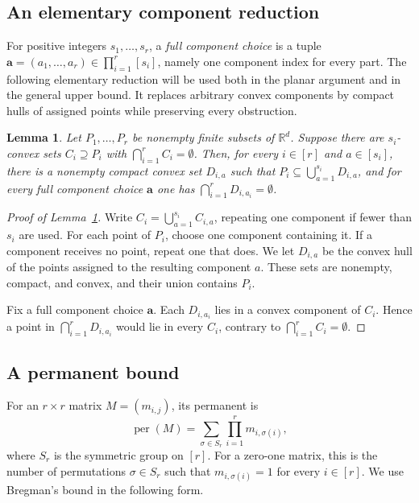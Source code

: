 \documentclass[11pt]{article}
\newtheorem{lemma}[theorem]{Lemma}
\theoremstyle{definition}
\newcommand{\R}{\mathbb{R}}
\begin{document}
\subsection{An elementary component reduction}

For positive integers \(s_{1},\ldots,s_{r}\), a \emph{full component choice} is a tuple \(\boldsymbol{a}=(a_{1},\ldots,a_{r})\in\prod_{i=1}^{r}[s_{i}]\), namely one component index for every part. The following elementary reduction will be used both in the planar argument and in the general upper bound. It replaces arbitrary convex components by compact hulls of assigned points while preserving every obstruction.

\begin{lemma}\label{lem:component-reduction}
Let \(P_{1},\ldots,P_{r}\) be nonempty finite subsets of \(\R^{d}\). Suppose there are \(s_{i}\)-convex sets \(C_{i}\supseteq P_{i}\) with \(\bigcap_{i=1}^{r}C_{i}=\emptyset\). Then, for every \(i\in [r]\) and \(a\in [s_{i}]\), there is a nonempty compact convex set \(D_{i,a}\) such that \(P_{i}\subseteq\bigcup_{a=1}^{s_{i}}D_{i,a}\), and for every full component choice \(\boldsymbol{a}\) one has \(\bigcap_{i=1}^{r}D_{i,a_{i}}=\emptyset\).
\end{lemma}
\begin{proof}[Proof of Lemma~\ref{lem:component-reduction}]
Write \(C_{i}=\bigcup_{a=1}^{s_{i}}C_{i,a}\), repeating one component if fewer than \(s_{i}\) are used. For each point of \(P_{i}\), choose one component containing it. If a component receives no point, repeat one that does. We let \(D_{i,a}\) be the convex hull of the points assigned to the resulting component \(a\). These sets are nonempty, compact, and convex, and their union contains \(P_{i}\).

Fix a full component choice \(\boldsymbol{a}\). Each \(D_{i,a_{i}}\) lies in a convex component of \(C_{i}\). Hence a point in \(\bigcap_{i=1}^{r}D_{i,a_{i}}\) would lie in every \(C_{i}\), contrary to \(\bigcap_{i=1}^{r}C_{i}=\emptyset\).
\end{proof}

\subsection{A permanent bound}

For an \(r\times r\) matrix \(M=(m_{i,j})\), its permanent is
\[
\operatorname{per}(M)=\sum_{\sigma\in S_{r}}\prod_{i=1}^{r}m_{i,\sigma(i)},
\]
where \(S_{r}\) is the symmetric group on \([r]\). For a zero-one matrix, this is the number of permutations \(\sigma\in S_{r}\) such that \(m_{i,\sigma(i)}=1\) for every \(i\in[r]\). We use Bregman's bound in the following form.
\end{document}
